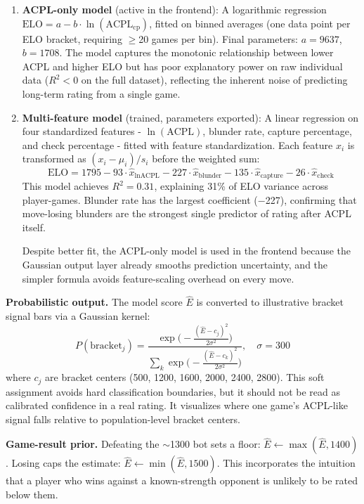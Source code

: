 \documentclass[a4paper]{article}
\begin{document}
\begin{enumerate}[itemsep=0.45em, topsep=0.35em]
  \item \textbf{ACPL-only model} (active in the frontend): A logarithmic regression $\text{ELO} = a - b \cdot \ln(\text{ACPL}_{\text{cp}})$, fitted on binned averages (one data point per ELO bracket, requiring $\geq$20 games per bin). Final parameters: $a = 9637$, $b = 1708$. The model captures the monotonic relationship between lower ACPL and higher ELO but has poor explanatory power on raw individual data ($R^2 < 0$ on the full dataset), reflecting the inherent noise of predicting long-term rating from a single game.

  \item \textbf{Multi-feature model} (trained, parameters exported): A linear regression on four standardized features - $\ln(\text{ACPL})$, blunder rate, capture percentage, and check percentage - fitted with feature standardization. Each feature $x_i$ is transformed as $(x_i - \mu_i) / s_i$ before the weighted sum:
  \[
    \text{ELO} = 1795 - 93 \cdot \hat{x}_{\ln\text{ACPL}} - 227 \cdot \hat{x}_{\text{blunder}} - 135 \cdot \hat{x}_{\text{capture}} - 26 \cdot \hat{x}_{\text{check}}
  \]
  This model achieves $R^2 = 0.31$, explaining 31\% of ELO variance across player-games. Blunder rate has the largest coefficient ($-$227), confirming that move-losing blunders are the strongest single predictor of rating after ACPL itself.

  Despite better fit, the ACPL-only model is used in the frontend because the Gaussian output layer already smooths prediction uncertainty, and the simpler formula avoids feature-scaling overhead on every move.
\end{enumerate}

\textbf{Probabilistic output.}
The model score $\hat{E}$ is converted to illustrative bracket signal bars via a Gaussian kernel:
\[
  P(\text{bracket}_j) = \frac{\exp\!\bigl(-\frac{(\hat{E} - c_j)^2}{2\sigma^2}\bigr)}{\sum_{k} \exp\!\bigl(-\frac{(\hat{E} - c_k)^2}{2\sigma^2}\bigr)}, \quad \sigma = 300
\]
where $c_j$ are bracket centers (500, 1200, 1600, 2000, 2400, 2800). This soft assignment avoids hard classification boundaries, but it should not be read as calibrated confidence in a real rating. It visualizes where one game's ACPL-like signal falls relative to population-level bracket centers.

\textbf{Game-result prior.}
Defeating the $\sim$1300 bot sets a floor: $\hat{E} \leftarrow \max(\hat{E}, 1400)$. Losing caps the estimate: $\hat{E} \leftarrow \min(\hat{E}, 1500)$. This incorporates the intuition that a player who wins against a known-strength opponent is unlikely to be rated below them.
\end{document}
